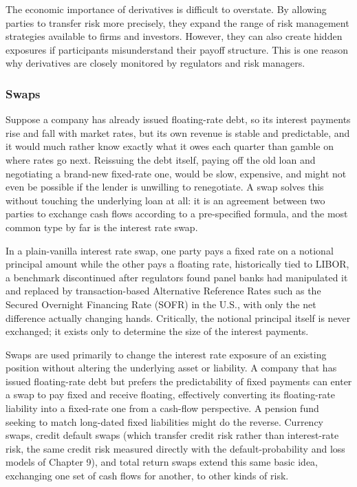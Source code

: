 \documentclass[../ai_in_finance]{subfiles}
\begin{document}
The economic importance of derivatives is difficult to overstate. By allowing parties to transfer risk more precisely, they expand the range of risk management strategies available to firms and investors. However, they can also create hidden exposures if participants misunderstand their payoff structure. This is one reason why derivatives are closely monitored by regulators and risk managers.

\subsubsection*{Swaps}

Suppose a company has already issued floating-rate debt, so its interest payments rise and fall with market rates, but its own revenue is stable and predictable, and it would much rather know exactly what it owes each quarter than gamble on where rates go next. Reissuing the debt itself, paying off the old loan and negotiating a brand-new fixed-rate one, would be slow, expensive, and might not even be possible if the lender is unwilling to renegotiate.
A swap solves this without touching the underlying loan at all: it is an agreement between two parties to exchange cash flows according to a pre-specified formula, and the most common type by far is the interest rate swap.

In a plain-vanilla interest rate swap, one party pays a fixed rate on a notional principal amount while the other pays a floating rate, historically tied to LIBOR, a benchmark discontinued after regulators found panel banks had manipulated it and replaced by transaction-based Alternative Reference Rates such as the Secured Overnight Financing Rate (SOFR) in the U.S., with only the net difference actually changing hands. Critically, the notional principal itself is never exchanged; it exists only to determine the size of the interest payments.

Swaps are used primarily to change the interest rate exposure of an existing position without altering the underlying asset or liability. A company that has issued floating-rate debt but prefers the predictability of fixed payments can enter a swap to pay fixed and receive floating, effectively converting its floating-rate liability into a fixed-rate one from a cash-flow perspective. A pension fund seeking to match long-dated fixed liabilities might do the reverse. Currency swaps, credit default swaps (which transfer credit risk rather than interest-rate risk, the same credit risk measured directly with the default-probability and loss models of Chapter 9), and total return swaps extend this same basic idea, exchanging one set of cash flows for another, to other kinds of risk.
\end{document}

